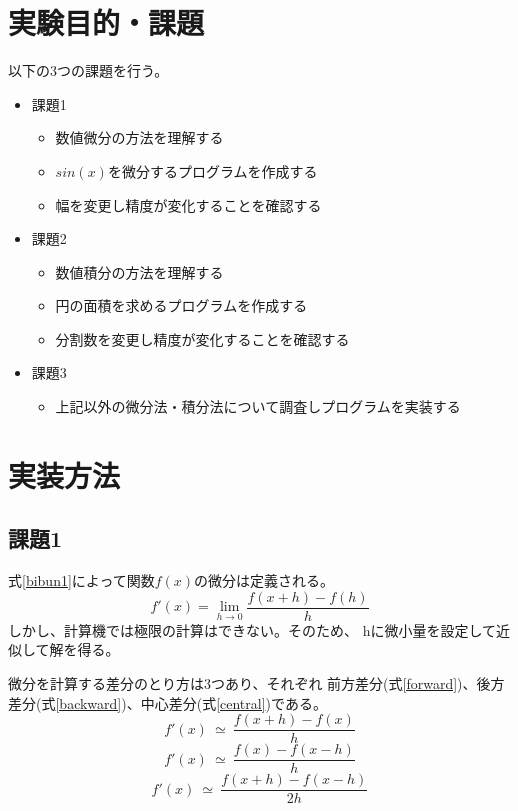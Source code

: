 \documentclass[dvipdfmx]{jsarticle}
\begin{document}
\section{実験目的・課題}
以下の3つの課題を行う。
\begin{itemize}
  \item 課題1
        \begin{itemize}
          \item 数値微分の方法を理解する
          \item $sin(x)$を微分するプログラムを作成する
          \item 幅を変更し精度が変化することを確認する
        \end{itemize}
  \item 課題2
        \begin{itemize}
          \item 数値積分の方法を理解する
          \item 円の面積を求めるプログラムを作成する
          \item 分割数を変更し精度が変化することを確認する
        \end{itemize}
  \item 課題3
        \begin{itemize}
          \item 上記以外の微分法・積分法について調査しプログラムを実装する
        \end{itemize}
\end{itemize}

\section{実装方法}

\subsection{課題1}

式\ref{bibun1}によって関数$f(x)$の微分は定義される。
\begin{equation}
  f'(x) = \lim_{h \to 0} \frac{f(x+h)-f(h)}{h}
  \label{bibun1}
\end{equation}
しかし、計算機では極限の計算はできない。そのため、
hに微小量を設定して近似して解を得る。

微分を計算する差分のとり方は3つあり、それぞれ
前方差分(式\ref{forward})、後方差分(式\ref{backward})、中心差分(式\ref{central})である。
\begin{equation}
  f'(x) ~\simeq~ \frac{f(x+h)-f(x)}{h}
  \label{forward}
\end{equation}
\begin{equation}
  f'(x) ~\simeq~ \frac{f(x)-f(x-h)}{h}
  \label{backward}
\end{equation}
\begin{equation}
  f'(x) ~\simeq~ \frac{f(x+h)-f(x-h)}{2h}
  \label{central}
\end{equation}
\end{document}
